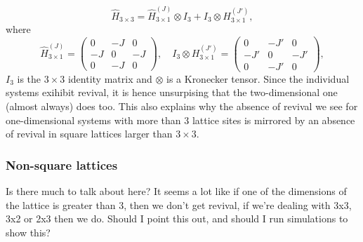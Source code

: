 \documentclass[a4paper, 10pt]{article}
\theoremstyle{plain}
\begin{document}
\begin{equation}
 \hat{H}_{3\times3}=\hat{H}_{3\times1}^{(J)}\otimes {I}_3
 +
 {I}_3\otimes H_{3\times1}^{(J')},
\end{equation}
where 
\begin{equation}
    \hat{H}_{3\times1}^{(J)}
    =
    \begin{pmatrix}
         0 & -J &  0 \\
        -J &  0 & -J \\
         0 & -J &  0
    \end{pmatrix},
    \quad
    {I}_3\otimes H_{3\times1}^{(J')}
    =
    \begin{pmatrix}
         0 & -J' &  0 \\
        -J' &  0 & -J' \\
         0 & -J' &  0
    \end{pmatrix},
\end{equation}
$I_3$ is the $3\times3$ identity matrix and $\otimes$ is a Kronecker tensor.
Since the individual systems exihibit revival, it is hence unsurpising that 
the two-dimensional one (almost always) does too. This also explains why the 
absence of revival we see for one-dimensional systems with more than $3$ 
lattice sites is mirrored by an absence of revival in square lattices larger
than $3\times3$.
\subsubsection{Non-square lattices}
Is there much to talk about here? It seems a lot like if one of the dimensions
of the lattice is greater than 3, then we don't get revival, if we're dealing 
with 3x3, 3x2 or 2x3 then we do. Should I point this out, and should I run 
simulations to show this?


\newpage




\end{document}
